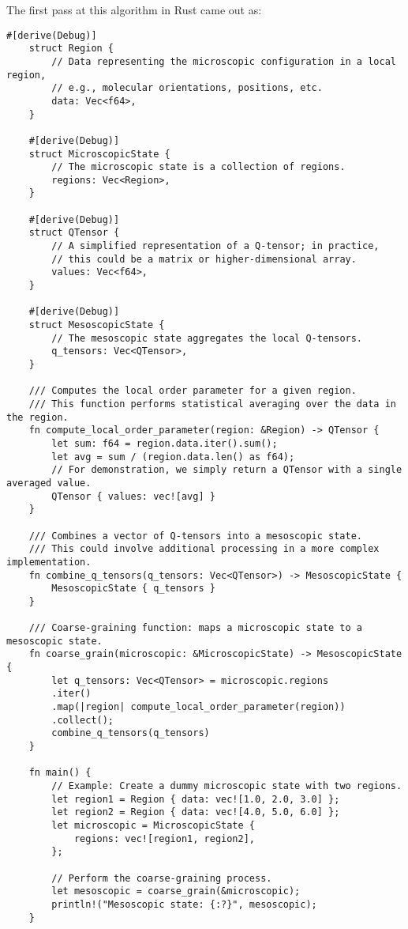 The first pass at this algorithm in Rust came out as:
\begin{lstlisting}[caption={Preliminary Rust Code for Coarse-Graining Liquid Crystal Configurations}]
	#[derive(Debug)]
	struct Region {
		// Data representing the microscopic configuration in a local region,
		// e.g., molecular orientations, positions, etc.
		data: Vec<f64>,
	}
	
	#[derive(Debug)]
	struct MicroscopicState {
		// The microscopic state is a collection of regions.
		regions: Vec<Region>,
	}
	
	#[derive(Debug)]
	struct QTensor {
		// A simplified representation of a Q-tensor; in practice,
		// this could be a matrix or higher-dimensional array.
		values: Vec<f64>,
	}
	
	#[derive(Debug)]
	struct MesoscopicState {
		// The mesoscopic state aggregates the local Q-tensors.
		q_tensors: Vec<QTensor>,
	}
	
	/// Computes the local order parameter for a given region.
	/// This function performs statistical averaging over the data in the region.
	fn compute_local_order_parameter(region: &Region) -> QTensor {
		let sum: f64 = region.data.iter().sum();
		let avg = sum / (region.data.len() as f64);
		// For demonstration, we simply return a QTensor with a single averaged value.
		QTensor { values: vec![avg] }
	}
	
	/// Combines a vector of Q-tensors into a mesoscopic state.
	/// This could involve additional processing in a more complex implementation.
	fn combine_q_tensors(q_tensors: Vec<QTensor>) -> MesoscopicState {
		MesoscopicState { q_tensors }
	}
	
	/// Coarse-graining function: maps a microscopic state to a mesoscopic state.
	fn coarse_grain(microscopic: &MicroscopicState) -> MesoscopicState {
		let q_tensors: Vec<QTensor> = microscopic.regions
		.iter()
		.map(|region| compute_local_order_parameter(region))
		.collect();
		combine_q_tensors(q_tensors)
	}
	
	fn main() {
		// Example: Create a dummy microscopic state with two regions.
		let region1 = Region { data: vec![1.0, 2.0, 3.0] };
		let region2 = Region { data: vec![4.0, 5.0, 6.0] };
		let microscopic = MicroscopicState {
			regions: vec![region1, region2],
		};
		
		// Perform the coarse-graining process.
		let mesoscopic = coarse_grain(&microscopic);
		println!("Mesoscopic state: {:?}", mesoscopic);
	}
\end{lstlisting}

